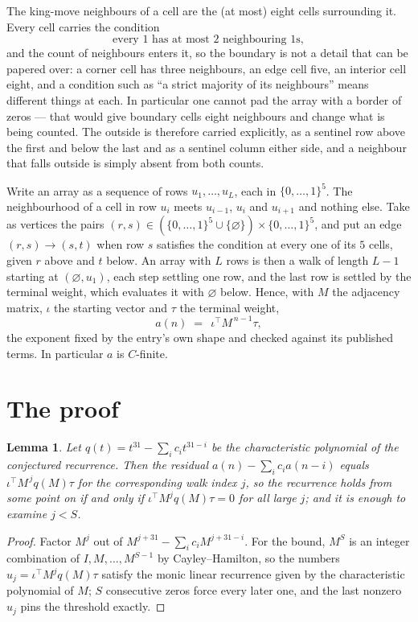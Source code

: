 \documentclass[11pt,a4paper]{article}
\theoremstyle{plain}
\newtheorem{lemma}[theorem]{Lemma}
\theoremstyle{definition}
\begin{document}
The king-move neighbours of a cell are the (at most) eight cells surrounding it. Every cell
carries the condition
\[
\text{every }1\text{ has at most }2\text{ neighbouring }1\text{s},
\]
and the count of neighbours enters it, so the boundary is not a detail that can be papered
over: a corner cell has three neighbours, an edge cell five, an interior cell eight, and a
condition such as ``a strict majority of its neighbours'' means different things at each. In
particular one cannot pad the array with a border of zeros --- that would give boundary cells
eight neighbours and change what is being counted. The outside is therefore carried
explicitly, as a sentinel row above the first and below the last and as a sentinel column
either side, and a neighbour that falls outside is simply absent from both counts.

Write an array as a sequence of rows $u_1,\dots,u_L$, each in
$\{0,\dots,1\}^{5}$. The neighbourhood of a cell in row $u_i$ meets $u_{i-1}$,
$u_i$ and $u_{i+1}$ and nothing else. Take as vertices the pairs
$(r,s)\in(\{0,\dots,1\}^{5}\cup\{\varnothing\})\times\{0,\dots,1\}^{5}$,
and put an edge $(r,s)\to(s,t)$ when row $s$ satisfies the condition at every one of its
$5$ cells, given $r$ above and $t$ below. An array with $L$ rows is then a walk of length
$L-1$ starting at $(\varnothing,u_1)$, each step settling one row, and the last row is
settled by the terminal weight, which evaluates it with $\varnothing$ below. Hence,
with $M$ the adjacency matrix, $\iota$ the starting vector and $\tau$ the terminal weight,
\[
a(n)\;=\;\,\iota^{\!\top}M^{\,n-1}\tau ,
\]
the exponent fixed by the entry's own shape and checked against its published terms. In
particular $a$ is $C$-finite.

\section{The proof}

\begin{lemma}\label{lem:crit}
Let $q(t)=t^{31}-\sum_i c_it^{31-i}$ be the characteristic polynomial of the
conjectured recurrence. Then the residual $a(n)-\sum_ic_ia(n-i)$ equals
$\iota^{\!\top}M^{\,j}q(M)\tau$ for the corresponding walk index $j$, so the
recurrence holds from some point on if and only if $\iota^{\!\top}M^{j}q(M)\tau=0$ for all
large $j$; and it is enough to examine $j<S$.
\end{lemma}

\begin{proof}
Factor $M^{j}$ out of $M^{j+31}-\sum_ic_iM^{j+31-i}$. For the bound, $M^{S}$
is an integer combination of $I,M,\dots,M^{S-1}$ by Cayley--Hamilton, so the numbers
$u_j=\iota^{\!\top}M^{j}q(M)\tau$ satisfy the monic linear recurrence given by the
characteristic polynomial of $M$; $S$ consecutive zeros force every later one, and the last
nonzero $u_j$ pins the threshold exactly.
\end{proof}
\end{document}
